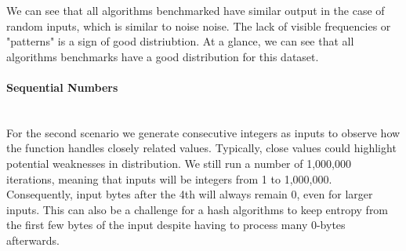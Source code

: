 \documentclass[10pt]{article}
\begin{document}
We can see that all algorithms benchmarked have similar output in the case of random inputs, which is similar to noise noise. The lack of visible frequencies or "patterns" is a sign of good distriubtion. At a glance, we can see that all algorithms benchmarks have a good distribution for this dataset.

\clearpage
\paragraph{Sequential Numbers}\leavevmode\\
For the second scenario we generate consecutive integers as inputs to observe how the function handles closely related values. Typically, close values could highlight potential weaknesses in distribution. We still run a number of 1,000,000 iterations, meaning that inputs will be integers from 1 to 1,000,000. Consequently, input bytes after the 4th will always remain 0, even for larger inputs. This can also be a challenge for a hash algorithms to keep entropy from the first few bytes of the input despite having to process many 0-bytes afterwards.
\end{document}
